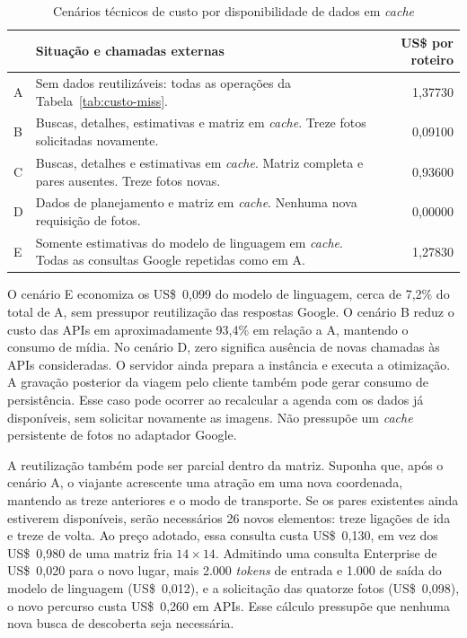 \begin{table}[H]
\centering
\small
\caption{Cenários técnicos de custo por disponibilidade de dados em \textit{cache}}
\label{tab:custo-hit}
\begin{tabularx}{\textwidth}{p{0.5cm}>{\raggedright\arraybackslash}Xr}
\hline
 & \textbf{Situação e chamadas externas} & \textbf{US\$ por roteiro} \\
\hline
A & Sem dados reutilizáveis: todas as operações da Tabela~\ref{tab:custo-miss}. & 1,37730 \\
B & Buscas, detalhes, estimativas e matriz em \textit{cache}. Treze fotos solicitadas novamente. & 0,09100 \\
C & Buscas, detalhes e estimativas em \textit{cache}. Matriz completa e pares ausentes. Treze fotos novas. & 0,93600 \\
D & Dados de planejamento e matriz em \textit{cache}. Nenhuma nova requisição de fotos. & 0,00000 \\
E & Somente estimativas do modelo de linguagem em \textit{cache}. Todas as consultas Google repetidas como em A. & 1,27830 \\
\hline
\end{tabularx}
\end{table}

O cenário E economiza os US\$~0,099 do modelo de linguagem, cerca de 7,2\% do total de A, sem pressupor reutilização das respostas Google. O cenário B reduz o custo das APIs em aproximadamente 93,4\% em relação a A, mantendo o consumo de mídia. No cenário D, zero significa ausência de novas chamadas às APIs consideradas. O servidor ainda prepara a instância e executa a otimização. A gravação posterior da viagem pelo cliente também pode gerar consumo de persistência. Esse caso pode ocorrer ao recalcular a agenda com os dados já disponíveis, sem solicitar novamente as imagens. Não pressupõe um \textit{cache} persistente de fotos no adaptador Google.

A reutilização também pode ser parcial dentro da matriz. Suponha que, após o cenário A, o viajante acrescente uma atração em uma nova coordenada, mantendo as treze anteriores e o modo de transporte. Se os pares existentes ainda estiverem disponíveis, serão necessários 26 novos elementos: treze ligações de ida e treze de volta. Ao preço adotado, essa consulta custa US\$~0,130, em vez dos US\$~0,980 de uma matriz fria $14\times14$. Admitindo uma consulta Enterprise de US\$~0,020 para o novo lugar, mais 2.000 \textit{tokens} de entrada e 1.000 de saída do modelo de linguagem (US\$~0,012), e a solicitação das quatorze fotos (US\$~0,098), o novo percurso custa US\$~0,260 em APIs. Esse cálculo pressupõe que nenhuma nova busca de descoberta seja necessária.

